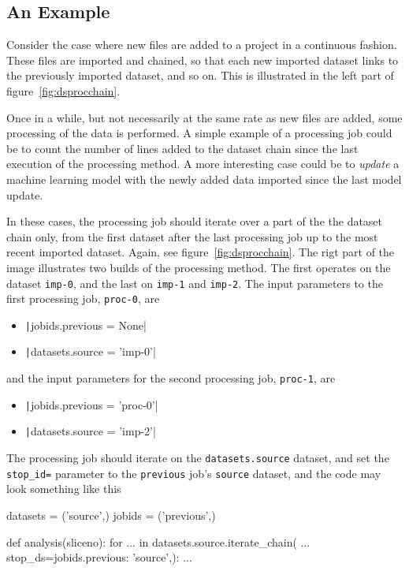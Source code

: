 \subsection*{An Example}
Consider the case where new files are added to a project in a
continuous fashion.  These files are imported and chained, so that
each new imported dataset links to the previously imported dataset,
and so on.  This is illustrated in the left part of
figure~\ref{fig:dsprocchain}.

Once in a while, but not necessarily at the same rate as new files are
added, some processing of the data is performed.  A simple example of
a processing job could be to count the number of lines added to the
dataset chain since the last execution of the processing method.  A
more interesting case could be to \textsl{update} a machine learning
model with the newly added data imported since the last model update.

In these cases, the processing job should iterate over a part of the
the dataset chain only, from the first dataset after the last
processing job up to the most recent imported dataset.  Again, see
figure~\ref{fig:dsprocchain}.  The rigt part of the image illustrates
two builds of the processing method.  The first operates on the
dataset \texttt{imp-0}, and the last on \texttt{imp-1}
and \texttt{imp-2}.  The input parameters to the first processing
job, \texttt{proc-0}, are
\begin{itemize}
\item[] \texttt|jobids.previous = None|
\item[] \texttt|datasets.source = 'imp-0'|
\end{itemize}
and the input parameters for the second processing
job, \texttt{proc-1}, are
\begin{itemize}
\item[] \texttt|jobids.previous = 'proc-0'|
\item[] \texttt|datasets.source = 'imp-2'|
\end{itemize}

The processing job should iterate on the \texttt{datasets.source}
dataset, and set the \texttt{stop\_id=} parameter to
the \texttt{previous} job's \texttt{source} dataset, and the code may
look something like this
\begin{python}
datasets = ('source',)
jobids = ('previous',)

def analysis(sliceno):
    for ... in datasets.source.iterate_chain(
            ...
            stop_ds={jobids.previous: 'source',}):
    ...
\end{python}











